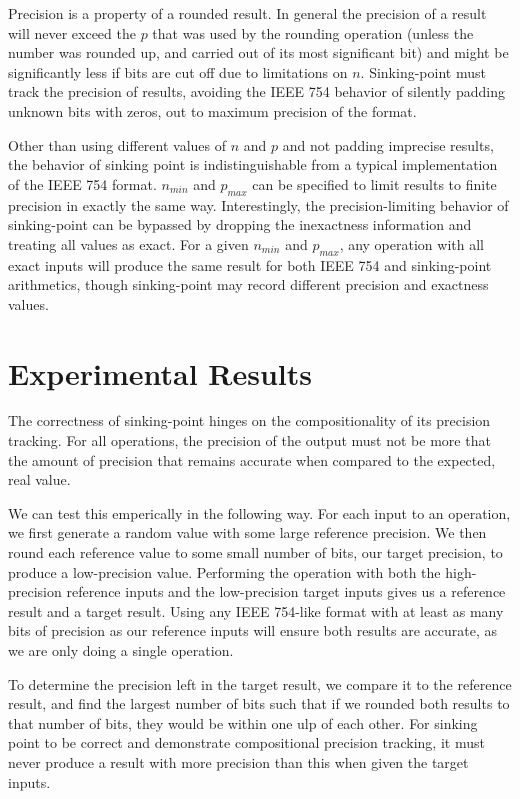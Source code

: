 \documentclass[letterpaper,10pt]{article}
\begin{document}
Precision is a property of a rounded result. In general the precision of a result will never exceed the $p$ that was used by the rounding operation (unless the number was rounded up, and carried out of its most significant bit) and might be significantly less if bits are cut off due to limitations on $n$. Sinking-point must track the precision of results, avoiding the IEEE 754 behavior of silently padding unknown bits with zeros, out to maximum precision of the format.

Other than using different values of $n$ and $p$ and not padding imprecise results, the behavior of sinking point is indistinguishable from a typical implementation of the IEEE 754 format. $n_{min}$ and $p_{max}$ can be specified to limit results to finite precision in exactly the same way. Interestingly, the precision-limiting behavior of sinking-point can be bypassed by dropping the inexactness information and treating all values as exact. For a given $n_{min}$ and $p_{max}$, any operation with all exact inputs will produce the same result for both IEEE 754 and sinking-point arithmetics, though sinking-point may record different precision and exactness values.

\section{Experimental Results}

The correctness of sinking-point hinges on the compositionality of its precision tracking. For all operations, the precision of the output must not be more that the amount of precision that remains accurate when compared to the expected, real value.

We can test this emperically in the following way. For each input to an operation, we first generate a random value with some large reference precision. We then round each reference value to some small number of bits, our target precision, to produce a low-precision value. Performing the operation with both the high-precision reference inputs and the low-precision target inputs gives us a reference result and a target result. Using any IEEE 754-like format with at least as many bits of precision as our reference inputs will ensure both results are accurate, as we are only doing a single operation.

To determine the precision left in the target result, we compare it to the reference result, and find the largest number of bits such that if we rounded both results to that number of bits, they would be within one ulp of each other. For sinking point to be correct and demonstrate compositional precision tracking, it must never produce a result with more precision than this when given the target inputs.
\end{document}
